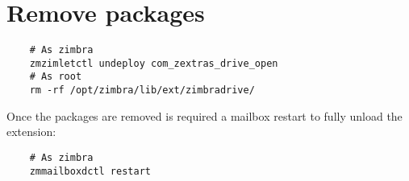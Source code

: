 \section{Remove packages}
    \begin{verbatim}
    # As zimbra
    zmzimletctl undeploy com_zextras_drive_open
    # As root
    rm -rf /opt/zimbra/lib/ext/zimbradrive/
    \end{verbatim}
    Once the packages are removed is required a mailbox restart to fully unload the extension:
    \begin{verbatim}
    # As zimbra
    zmmailboxdctl restart
    \end{verbatim}
